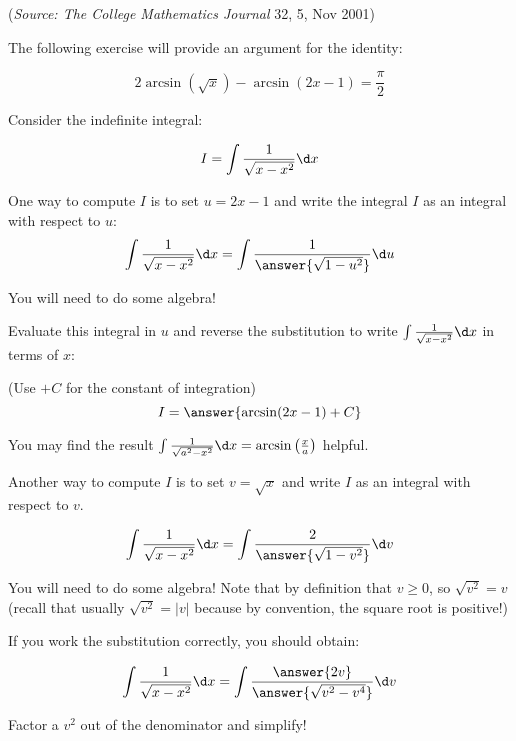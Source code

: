 \documentclass{ximera}
\author{Jim Talamo}
\begin{document}
(\emph{Source: The College Mathematics Journal} 32, 5, Nov 2001)

\begin{exercise}
The following exercise will provide an argument for the identity:

\[
2 \arcsin(\sqrt{x})-\arcsin(2x-1)= \frac{\pi}{2}
\]

Consider the indefinite integral: 

\[
I = \int \frac{1}{\sqrt{x-x^2}} \d x
\]


\begin{exercise}
One way to compute $I$ is to set $u=2x-1$ and write the integral $I$ as an integral with respect to $u$:
\[
\int \frac{1}{\sqrt{x-x^2}} \d x = \int\frac{1}{ \answer{\sqrt{1-u^2}}} \d u
\]
\begin{hint}
You will need to do some algebra!
\end{hint}

\begin{exercise}
Evaluate this integral in $u$ and reverse the substitution to write $\int \frac{1}{\sqrt{x-x^2}} \d x$ in terms of $x$:

(Use $+C$ for the constant of integration)
\[
I = \answer{\arcsin(2x-1)+C}
\]

\begin{hint}
You may find the result $\int \frac{1}{\sqrt{a^2-x^2}} \d x = \arcsin\left(\frac{x}{a}\right)$ helpful.
\end{hint}

\end{exercise}

\begin{exercise}
Another way to compute $I$ is to set $v=\sqrt{x}$ and write $I$ as an integral with respect to $v$.

\[
\int \frac{1}{\sqrt{x-x^2}} \d x  = \int\frac{2}{ \answer{\sqrt{1-v^2}}} \d v
\]
\begin{hint}
You will need to do some algebra! Note that by definition that $v\geq 0$, so $\sqrt{v^2} = v$ (recall that usually $\sqrt{v^2} = |v|$ because by convention, the square root is positive!)

If you work the substitution correctly, you should obtain:

\[
\int \frac{1}{\sqrt{x-x^2}} \d x  = \int\frac{\answer{2v}}{ \answer{\sqrt{v^2-v^4}}} \d v
\]

Factor a $v^2$ out of the denominator and simplify!
\end{hint}


\end{exercise}


\end{exercise}
\end{exercise}
\end{document}
